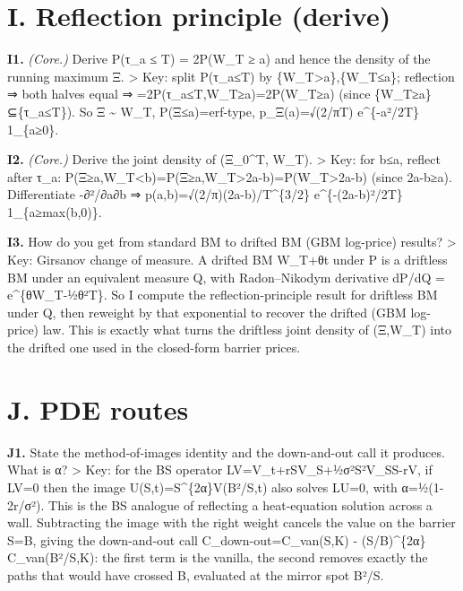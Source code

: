 \documentclass[
  11pt,
]{article}
\begin{document}
\hypertarget{i.-reflection-principle-derive}{%
\section{I. Reflection principle
(derive)}\label{i.-reflection-principle-derive}}

\textbf{I1.} \emph{(Core.)} Derive P(τ\_a ≤ T) = 2P(W\_T ≥ a) and hence
the density of the running maximum Ξ. \textgreater{} Key: split
P(τ\_a≤T) by \{W\_T\textgreater a\},\{W\_T≤a\}; reflection ⇒ both halves
equal ⇒ =2P(τ\_a≤T,W\_T≥a)=2P(W\_T≥a) (since \{W\_T≥a\}⊆\{τ\_a≤T\}). So
Ξ \textasciitilde{} \textbar W\_T\textbar, P(Ξ≤a)=erf-type,
p\_Ξ(a)=√(2/πT) e\^{}\{-a²/2T\} 1\_\{a≥0\}.

\textbf{I2.} \emph{(Core.)} Derive the joint density of (Ξ\_0\^{}T,
W\_T). \textgreater{} Key: for b≤a, reflect after τ\_a:
P(Ξ≥a,W\_T\textless b)=P(Ξ≥a,W\_T\textgreater2a-b)=P(W\_T\textgreater2a-b)
(since 2a-b≥a). Differentiate -∂²/∂a∂b ⇒
p(a,b)=√(2/π)(2a-b)/T\^{}\{3/2\} e\^{}\{-(2a-b)²/2T\} 1\_\{a≥max(b,0)\}.

\textbf{I3.} How do you get from standard BM to drifted BM (GBM
log-price) results? \textgreater{} Key: Girsanov change of measure. A
drifted BM W\_T+θt under P is a driftless BM under an equivalent measure
Q, with Radon--Nikodym derivative dP/dQ = e\^{}\{θW\_T-½θ²T\}. So I
compute the reflection-principle result for driftless BM under Q, then
reweight by that exponential to recover the drifted (GBM log-price) law.
This is exactly what turns the driftless joint density of (Ξ,W\_T) into
the drifted one used in the closed-form barrier prices.

\hypertarget{j.-pde-routes}{%
\section{J. PDE routes}\label{j.-pde-routes}}

\textbf{J1.} State the method-of-images identity and the down-and-out
call it produces. What is α? \textgreater{} Key: for the BS operator
LV=V\_t+rSV\_S+½σ²S²V\_SS-rV, if LV=0 then the image
U(S,t)=S\^{}\{2α\}V(B²/S,t) also solves LU=0, with α=½(1-2r/σ²). This is
the BS analogue of reflecting a heat-equation solution across a wall.
Subtracting the image with the right weight cancels the value on the
barrier S=B, giving the down-and-out call C\_down-out=C\_van(S,K) -
(S/B)\^{}\{2α\} C\_van(B²/S,K): the first term is the vanilla, the
second removes exactly the paths that would have crossed B, evaluated at
the mirror spot B²/S.
\end{document}
